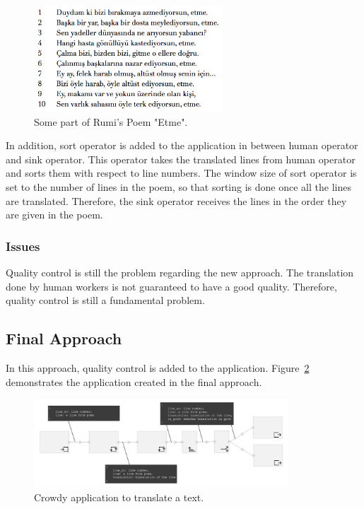 \begin{figure}[ht]
	\centering
	\includegraphics[height=150px]{figures/scenarios/poem2.png}
	\caption{Some part of Rumi's Poem "Etme".}
	\label{fig:scenario2.poem2}
\end{figure}

In addition, sort operator is added to the application in between human operator and sink operator. This operator takes the translated lines from human operator and sorts them with respect to line numbers. The window size of sort operator is set to the number of lines in the poem, so that sorting is done once all the lines are translated. Therefore, the sink operator receives the lines in the order they are given in the poem.

\subsubsection{Issues}
Quality control is still the problem regarding the new approach. The translation done by human workers is not guaranteed to have a good quality. Therefore, quality control is still a fundamental problem.

\subsection{Final Approach}
In this approach, quality control is added to the application. Figure~\ref{fig:scenario2.2} demonstrates the application created in the final approach.

\begin{figure}[ht]
	\centering
	\includegraphics[width=0.85\textwidth]{figures/scenarios/scenario2_3a.png}
	\caption{Crowdy application to translate a text.}
	\label{fig:scenario2.2}
\end{figure}

